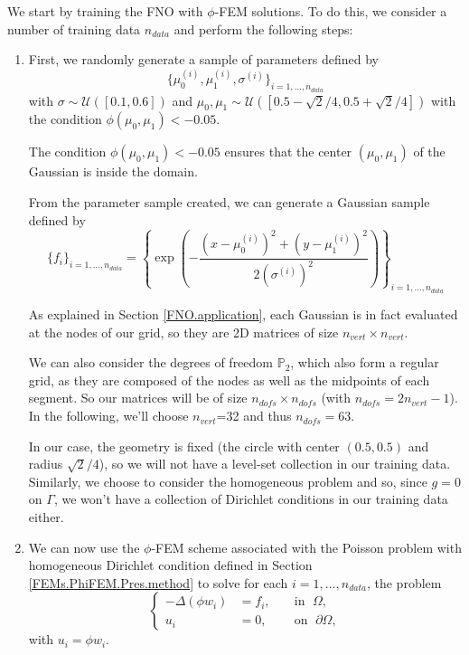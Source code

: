 We start by training the FNO with $\phi$-FEM solutions. To do this, we consider a number of training data $n_{data}$ and perform the following steps:
\begin{enumerate}[label=\textbullet]
	\item First, we randomly generate a sample of parameters defined by
	\begin{equation*}
		\{\mu_0^{(i)},\mu_1^{(i)},\sigma^{(i)}\}_{i=1,\dots,n_{data}}
	\end{equation*}
	with $\sigma \sim \mathcal{U}([0.1,0.6])$ and $\mu_0, \mu_1 \sim \mathcal{U}([0.5-\sqrt{2}/4, 0.5+\sqrt{2}/4])$ with the condition $\phi(\mu_0, \mu_1) < -0.05$.
	
	\begin{Rem}
		The condition $\phi(\mu_0, \mu_1) < -0.05$ ensures that the center $(\mu_0, \mu_1)$ of the Gaussian is inside the domain.
	\end{Rem}
	
	From the parameter sample created, we can generate a Gaussian sample defined by
	\begin{equation*}
		\{f_i\}_{i=1,\dots,n_{data}}=\left\{\exp\left(-\frac{(x-\mu_0^{(i)})^2 + (y-\mu_1^{(i)})^2}{2(\sigma^{(i)})^2}\right)\right\}_{i=1,\dots,n_{data}}
	\end{equation*}
	
	\begin{Rem}
		As explained in Section \ref{FNO.application}, each Gaussian is in fact evaluated at the nodes of our grid, so they are 2D matrices of size $n_{vert}\times n_{vert}$.
		
		We can also consider the degrees of freedom $\mathbb{P}_2$, which also form a regular grid, as they are composed of the nodes as well as the midpoints of each segment. So our matrices will be of size $n_{dofs}\times n_{dofs}$ (with $n_{dofs}=2n_{vert}-1$). In the following, we'll choose $n_{vert}$=32 and thus $n_{dofs}=63$.
	\end{Rem}
	
	In our case, the geometry is fixed (the circle with center $(0.5,0.5)$ and radius $\sqrt{2}/4$), so we will not have a level-set collection in our training data. Similarly, we choose to consider the homogeneous problem and so, since $g=0$ on $\Gamma$, we won't have a collection of Dirichlet conditions in our training data either.
	
	\item We can now use the $\phi$-FEM scheme associated with the Poisson problem with homogeneous Dirichlet condition defined in Section \ref{FEMs.PhiFEM.Pres.method} to solve for each $i=1,\dots,n_{data}$, the problem
	\begin{equation*}
		\left\{
		\begin{aligned}
			-\Delta (\phi w_i) &= f_i, \; &&\text{in } \; \Omega, \\
			u_i&=0, \; &&\text{on } \; \partial\Omega,
		\end{aligned}
		\right.
	\end{equation*}
	with $u_i=\phi w_i$.
	

\end{enumerate}
